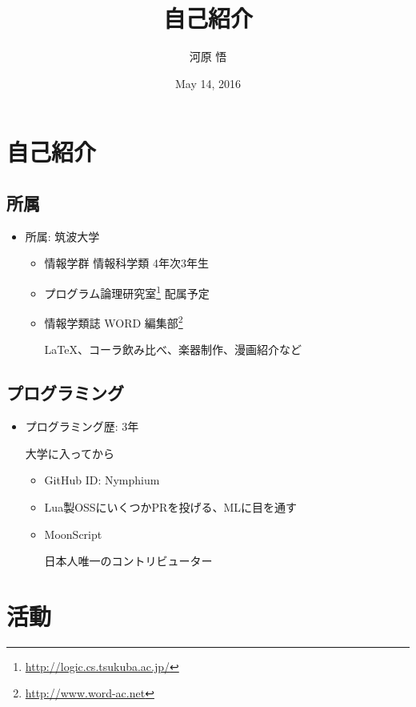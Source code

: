 \documentclass[aspectratio=169,unicode]{beamer}
\title{自己紹介}
\author{河原 悟}
\date{May 14, 2016}
\begin{document}
\maketitle
\skipnexttoc
\section{自己紹介}
\skipnexttoc
\subsection{所属}
\skipnexttoc
\begin{frame}
	\frametitlesubs
	\begin{itemize}
		\item 所属: 筑波大学
			\begin{itemize}
				\item 情報学群 情報科学類 4年次3年生
				\item プログラム論理研究室\footnote{\url{http://logic.cs.tsukuba.ac.jp/}} 配属予定
				\item 情報学類誌 WORD 編集部\footnote{\url{http://www.word-ac.net}}

					 \LaTeX、コーラ飲み比べ、楽器制作、漫画紹介など
		\end{itemize}
	\end{itemize}
\end{frame}
\subsection{プログラミング}
\begin{frame}
	\frametitlesubs
	\begin{itemize}
		\item プログラミング歴: 3年

			大学に入ってから
			\begin{itemize}
				\item GitHub ID: Nymphium
				\item {}

					Lua製OSSにいくつかPRを投げる、MLに目を通す
				\item \alert{MoonScript}

					日本人唯一のコントリビューター
			\end{itemize}
	\end{itemize}
\end{frame}
\section{活動}
\end{document}
